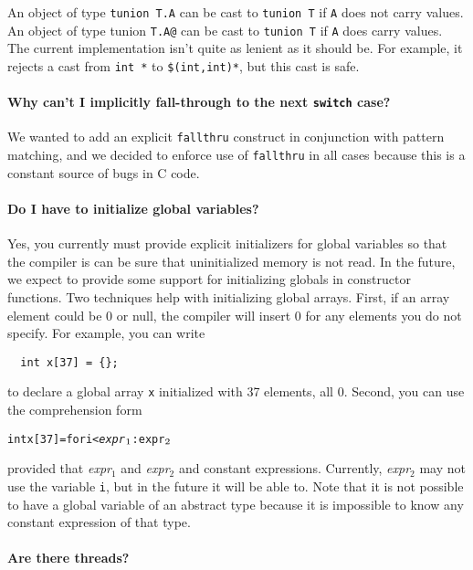 An object of type \texttt{tunion T.A} can be cast to \texttt{tunion T}
if \texttt{A} does not carry values.  An object of type tunion
\texttt{T.A@} can be cast to \texttt{tunion T} if \texttt{A} does
carry values.  The current implementation isn't quite as lenient as it
should be.  For example, it rejects a cast from \texttt{int *\rb} to
\texttt{\$(int,int)*\rb}, but this cast is safe.

\paragraph{Why can't I implicitly fall-through to the next
  \texttt{switch} case?} 

We wanted to add an explicit \texttt{fallthru} construct in
conjunction with pattern matching, and we decided to enforce use of
\texttt{fallthru} in all cases because this is a constant source of
bugs in C code.

\paragraph{Do I have to initialize global variables?}

Yes, you currently must provide explicit initializers for global
variables so that the compiler is can be sure that uninitialized
memory is not read.  In the future, we expect to provide some support
for initializing globals in constructor functions.  Two techniques
help with initializing global arrays.  First, if an array element
could be 0 or null, the compiler will insert 0 for any elements you do
not specify.  For example, you can write
\begin{verbatim}
  int x[37] = {};
\end{verbatim}
to declare a global array \texttt{x} initialized with 37 elements, all 0.
Second, you can use
the comprehension form
\begin{alltt}
  int x[37] = \lb for i < \textit{expr}\(\sb{1}\) : \texttt{expr}\(\sb{2}\) \rb
\end{alltt}
provided that 
\textit{expr}$_1$ and
\textit{expr}$_2$ and
constant expressions.
Currently, \textit{expr}$_2$ may not use the variable \texttt{i}, but
in the future it will be able to.  Note that it is not possible to
have a global variable of an abstract type because it is impossible to
know any constant expression of that type.

\paragraph{Are there threads?}

